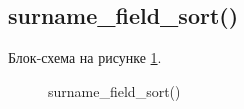\subsection{surname\_field\_sort()}

Блок-схема на рисунке \ref{fig:surname_field_sort}.

\begin{figure}[p]
    \caption{surname\_field\_sort()}
    \label{fig:surname_field_sort}
\end{figure}





\newpage